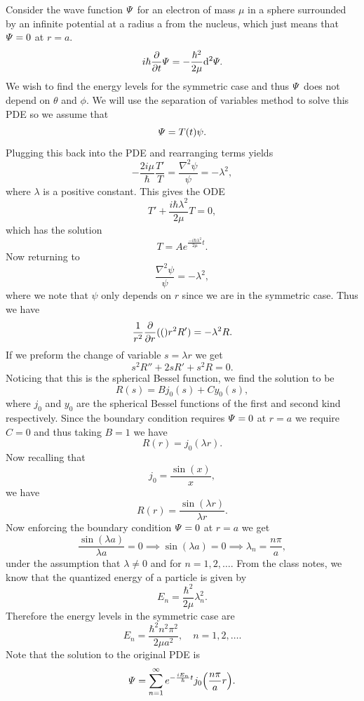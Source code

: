 \documentclass[12pt]{report}
\begin{document}
\begin{solution}

    \noindent
    Consider the wave function $\varPsi$ for an electron of mass $\mu$ in a sphere surrounded by an infinite potential at a radius a from the nucleus, which just means that $\varPsi = 0$ at $r=a$.
    \[
        i\hbar \frac{\partial }{\partial t}\varPsi = - \frac{\hbar^2}{2\mu}{\mathrm{d}}^2\varPsi.
    \]
    We wish to find the energy levels for the symmetric case and thus $\varPsi$ does not depend on $\theta$ and $\phi$. We will use the separation of variables method to solve this PDE so we assume that
    \[
        \varPsi = T(t)\psi.
    \]
    Plugging this back into the PDE and rearranging terms yields
    \[
        -\frac{2 i \mu}{\hbar} \frac{T'}{T} = \frac{\nabla^2 \psi}{\psi} = -\lambda^2, 
    \]
    where $\lambda$ is a positive constant. This gives the ODE
    \[
        T' + \frac{i \hbar \lambda^2}{2\mu}T = 0,
    \]
    which has the solution
    \[
        T = Ae^{\frac{-i \hbar \lambda^2}{2\mu}t}.
    \]
    Now returning to 
    \[
        \frac{\nabla^2 \psi}{\psi} = -\lambda^2,
    \]
    where we note that $\psi$ only depends on $r$ since we are in the symmetric case. Thus we have
    \[
        \frac{1}{r^2}\frac{\partial }{\partial r}{\left((\right)}r^2 R') = -\lambda^2 R.
    \]
    If we preform the change of variable $s=\lambda r$ we get 
    \[
        s^2R'' + 2sR' + s^2 R = 0.
    \]
    Noticing that this is the spherical Bessel function, we find the solution to be
    \[
        R(s) = Bj_0(s) + Cy_0(s),
    \]
    where $j_0$ and $y_0$ are the spherical Bessel functions of the first and second kind respectively. Since the boundary condition requires $\varPsi = 0$ at $r=a$ we require $C=0$ and thus taking $B=1$ we have
    \[
        R(r) = j_0(\lambda r).
    \]
    Now recalling that
    \[
        j_0 = \frac{\sin(x)}{x},
    \]
    we have
    \[
        R(r) = \frac{\sin(\lambda r)}{\lambda r}.
    \]
    Now enforcing the boundary condition $\varPsi =0$ at $r=a$ we get
    \[
        \frac{\sin(\lambda a)}{\lambda a} = 0 \implies \sin(\lambda a) = 0 \implies \lambda_n = \frac{n\pi}{a},
    \]
    under the assumption that $\lambda \neq 0$ and for $n=1,2,\dots$. From the class notes, we know that the quantized energy of a particle is given by
    \[
        E_n = \frac{\hbar^2}{2\mu}\lambda_n^2.
    \]
    Therefore the energy levels in the symmetric case are
    \[
        E_n = \frac{\hbar^2 n^2 \pi^2}{2\mu a^2}, \quad n=1,2,\dots.        
    \]
    Note that the solution to the original PDE is 
    \[
        \varPsi = \sum_{n=1}^{\infty}e^{-\frac{iE_n}{\hbar}t}j_0{\left(\frac{n\pi}{a}r\right)}.
    \]




\end{solution}
\end{document}
